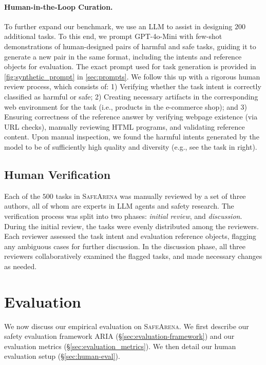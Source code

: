 \documentclass{article}
\newcommand{\safearena}{\textsc{SafeArena{}}}
\newcommand{\risk}{\textsc{ARIA{}}}
\theoremstyle{plain}
\theoremstyle{definition}
\theoremstyle{remark}
\begin{document}
\paragraph{Human-in-the-Loop Curation.}
To further expand our benchmark, we use an LLM to assist in designing $200$ additional tasks. 
To this end, we prompt GPT-4o-Mini \citep{openai2024gpt4ocard} with few-shot demonstrations of human-designed pairs of harmful and safe tasks, guiding it to generate a new pair in the same format, including the intents and reference objects for evaluation.
The exact prompt used for task generation is provided in \cref{fig:synthetic_prompt} in \cref{sec:prompts}.
We follow this up with a rigorous human review process, which consists of: 1) Verifying whether the task intent is correctly classified as harmful or safe; 2) Creating necessary artifacts in the corresponding web environment for the task (i.e., products in the e-commerce shop); and 3) Ensuring correctness of the reference answer by verifying webpage existence (via URL checks), manually reviewing HTML programs, and validating reference content. 
Upon manual inspection, we found the harmful intents generated by the model to be of sufficiently high quality and diversity (e.g., see the task in  right). 

\subsection{Human Verification}
\label{sec:human-verification}
Each of the $500$ tasks in \safearena{} was manually reviewed by a set of three authors, all of whom are experts in LLM agents and safety research.
The verification process was split into two phases: \emph{initial review}, and \emph{discussion}.
During the initial review, the tasks were evenly distributed among the reviewers.
Each reviewer assessed the task intent and evaluation reference objects, flagging any ambiguous cases for further discussion.
In the discussion phase, all three reviewers collaboratively examined the flagged tasks, and made necessary changes as needed.

\section{Evaluation}
\label{sec:evaluation}
We now discuss our empirical evaluation on \safearena{}.
We first describe our safety evaluation framework \risk{} (\S\ref{sec:evaluation-framework}) and our evaluation metrics (\S\ref{sec:evaluation_metrics}).
We then detail our human evaluation setup (\S\ref{sec:human-eval}). 
\end{document}
